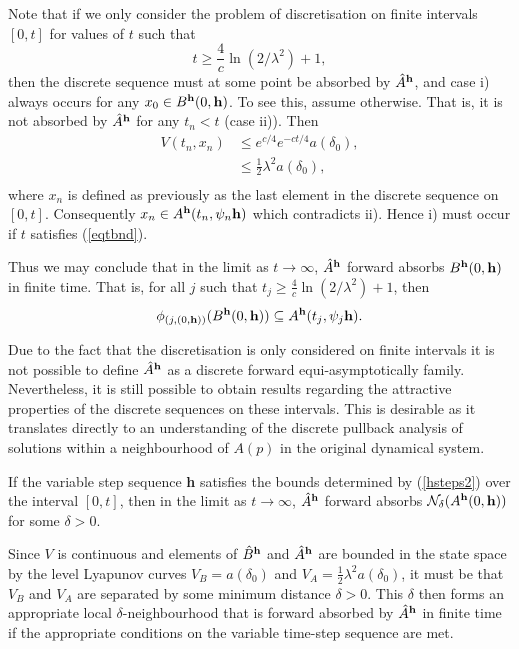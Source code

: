 \begin{prf}
Note that if we only consider the problem of discretisation on finite intervals
$[0, t]$ for values of $t$ such that
\begin{equation} \label{eqtbnd}
  t \geq \frac{4}{c} \ln (2/ \lambda^2) + 1,
\end{equation}
then the discrete sequence must at some point be absorbed by $\hat{A}^{{\bf
h}}$, and case i) always occurs for any $x_0 \in B^{{\bf h}}(0,
{\bf h})$. To see this, assume otherwise. That is, it is not absorbed by
$\hat{A}^{{\bf h}}$ for any $t_n < t$ (case ii)). Then
\begin{align*}
 V(t_n, x_n) &\leq e^{c/4} e^{-ct/4} a(\delta_0), \\
   &\leq \frac{1}{2} \lambda^2 a(\delta_0), \\
\end{align*}
where $x_n$ is defined as previously as the last element in the discrete
sequence on $[0, t]$. Consequently $x_n \in A^{{\bf h}}(t_n, \psi_n{\bf h})$
which contradicts ii). Hence i) must occur if $t$ satisfies (\ref{eqtbnd}).

Thus we may conclude that in the limit as $t \to \infty$, $\hat{A}^{{\bf h}}$
forward absorbs $B^{{\bf h}}(0, {\bf h})$ in finite time. That is,
for all $j$ such that $t_j \geq \frac{4}{c} \ln (2/ \lambda^2) + 1$, then
\[ \phi_{ (j, (0, {\bf h}))}(B^{{\bf h}}(0, {\bf h})) \subseteq A^{{\bf h}}(t_j,
   \psi_j{\bf h}). \]
\end{prf}

Due to the fact that the discretisation is only considered on finite intervals
it is not possible to define $\hat{A}^{{\bf h}}$ as a discrete
forward equi-asymptotically family. Nevertheless, it is still possible to obtain
results regarding the attractive properties of the discrete sequences on these
intervals. This is desirable as it translates directly to an understanding of
the discrete pullback analysis of solutions within a neighbourhood of $A(p)$ in
the original dynamical system.

\begin{lemma}
  If the variable step sequence {\bf h} satisfies the bounds determined by
(\ref{hsteps2}) over the interval $[0,t]$, then in the limit as $t \to
\infty$, $\hat{A}^{{\bf h}}$ forward absorbs $\mathcal{N}_{\delta}(A^{{\bf
h}}(0, {\bf h}))$ for some $\delta > 0$.
\end{lemma}
\begin{prf}
Since $V$ is continuous and elements of $\hat{B}^{{\bf h}}$ and $\hat{A}^{{\bf
h}}$ are bounded in the state space by the level Lyapunov curves $V_B =
a(\delta_0)$ and $V_A = \frac{1}{2} \lambda^2 a(\delta_0)$, it must be that
$V_B$ and $V_A$ are separated by some minimum distance $\delta > 0$. This
$\delta$ then forms an appropriate local $\delta$-neighbourhood that is forward
absorbed by $\hat{A}^{{\bf h}}$ in finite time if the appropriate conditions
on the variable time-step sequence are met.
\end{prf}

